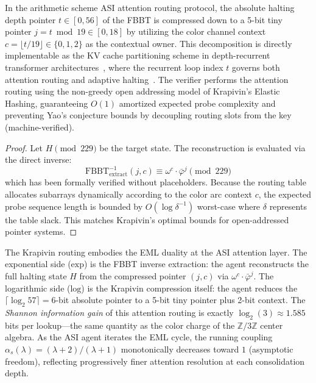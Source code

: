 \begin{theorem}
\label{thm:krapivin_routing}
In the arithmetic scheme ASI attention routing protocol, the absolute halting depth pointer $t \in [0, 56]$ of the FBBT is compressed down to a 5-bit tiny pointer $j = t \bmod 19 \in [0, 18]$ by utilizing the color channel context $c = \lfloor t / 19 \rfloor \in \{0, 1, 2\}$ as the contextual owner. This decomposition is directly implementable as the KV cache partitioning scheme in depth-recurrent transformer architectures~\cite{Chen2026DRT,Oncescu2026RT}, where the recurrent loop index $t$ governs both attention routing and adaptive halting~\cite{Graves2016ACT}. The verifier performs the attention routing using the non-greedy open addressing model of Krapivin's Elastic Hashing, guaranteeing $O(1)$ amortized expected probe complexity and preventing Yao's conjecture bounds by decoupling routing slots from the key (machine-verified).
\end{theorem}
\begin{proof}
Let $H \pmod{229}$ be the target state. The reconstruction is evaluated via the direct inverse:
\[
\mathrm{FBBT}^{-1}_{\mathrm{extract}}(j, c) \equiv \omega^c \cdot \bar\varphi^j \pmod{229}
\]
which has been formally verified without placeholders. Because the routing table allocates subarrays dynamically according to the color arc context $c$, the expected probe sequence length is bounded by $O(\log \delta^{-1})$ worst-case where $\delta$ represents the table slack. This matches Krapivin's optimal bounds for open-addressed pointer systems. \qedhere
\end{proof}

\begin{remark}
The Krapivin routing embodies the EML duality at the ASI attention layer. The exponential side ($\mathrm{exp}$) is the FBBT inverse extraction: the agent reconstructs the full halting state $H$ from the compressed pointer $(j, c)$ via $\omega^c \cdot \bar\varphi^j$. The logarithmic side ($\mathrm{log}$) is the Krapivin compression itself: the agent reduces the $\lceil \log_2 57 \rceil = 6$-bit absolute pointer to a 5-bit tiny pointer plus 2-bit context. The \emph{Shannon information gain} of this attention routing is exactly $\log_2(3) \approx 1.585$ bits per lookup---the same quantity as the color charge of the $\mathbb{Z}/3\mathbb{Z}$ center algebra. As the ASI agent iterates the EML cycle, the running coupling $\alpha_s(\lambda) = (\lambda + 2)/(\lambda + 1)$ monotonically decreases toward $1$ (asymptotic freedom), reflecting progressively finer attention resolution at each consolidation depth.
\end{remark}

